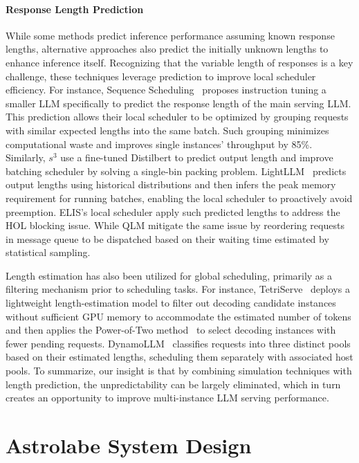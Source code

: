 \documentclass[sigconf, review, anonymous]{acmart}
\begin{document}
\paragraph{Response Length Prediction} \label{section:length_prediction}  While some methods predict inference performance assuming known response lengths, alternative approaches also predict the initially unknown lengths to enhance inference itself. Recognizing that the variable length of responses is a key challenge, these techniques leverage prediction to improve local scheduler efficiency. For instance, Sequence Scheduling~\cite{length_estimation} proposes instruction tuning a smaller LLM specifically to predict the response length of the main serving LLM. This prediction allows their local scheduler to be optimized by grouping requests with similar expected lengths into the same batch. Such grouping minimizes computational waste and improves single instances' throughput by 85\%. Similarly, $s^3$ \cite{s3} use a fine-tuned Distilbert \cite{sanh2020distilbertdistilledversionbert} to predict output length and improve batching scheduler by solving a single-bin packing problem. LightLLM~\cite{lightLLM} predicts output lengths using historical distributions and then infers the peak memory requirement for running batches, enabling the local scheduler to proactively avoid preemption.  ELIS's \cite{ELIS} local scheduler apply such predicted lengths to address the HOL blocking issue. While QLM \cite{QLMQueue} mitigate the same issue by reordering requests in message queue to be dispatched based on their waiting time estimated by statistical sampling.

Length estimation has also been utilized for global scheduling, primarily as a filtering mechanism prior to scheduling tasks. For instance, TetriServe~\cite{TetriServe} deploys a lightweight length-estimation model to filter out decoding candidate instances without sufficient GPU memory to accommodate the estimated number of tokens and then applies the Power-of-Two method~\cite{poweroftwo} to select decoding instances with fewer pending requests. DynamoLLM~\cite{dynamollm} classifies requests into three distinct pools based on their estimated lengths, scheduling them separately with associated host pools. To summarize, our insight is that by combining simulation techniques with length prediction, the unpredictability can be largely eliminated, which in turn creates an opportunity to improve multi-instance LLM serving performance.

\section{Astrolabe System Design} \label{section:system_design}
\end{document}
